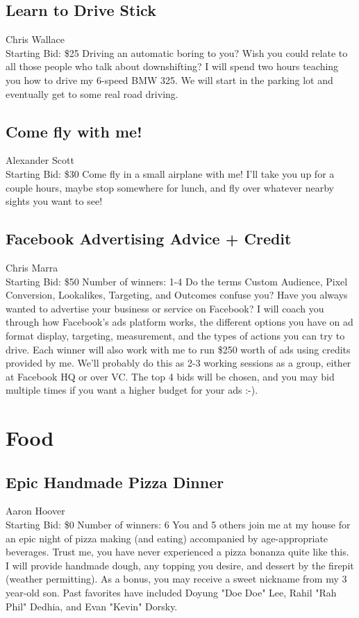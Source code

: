 \documentclass[11pt]{article}
\begin{document}
\subsection{Learn to Drive Stick}
Chris Wallace
\\
Starting Bid: \$25
\newline
Driving an automatic boring to you? Wish you could relate to all those people who talk about downshifting? I will spend two hours teaching you how to drive my 6-speed BMW 325. We will start in the parking lot and eventually get to some real road driving.
\subsection{Come fly with me!}
Alexander Scott
\\
Starting Bid: \$30
\newline
Come fly in a small airplane with me! I'll take you up for a couple hours, maybe stop somewhere for lunch, and fly over whatever nearby sights you want to see!
\subsection{Facebook Advertising Advice + Credit}
Chris Marra
\\
Starting Bid: \$50
\newline
Number of winners: 1-4
\newline
Do the terms Custom Audience, Pixel Conversion, Lookalikes, Targeting, and Outcomes confuse you? Have you always wanted to advertise your business or service on Facebook? I will coach you through how Facebook's ads platform works, the different options you have on ad format display, targeting, measurement, and the types of actions you can try to drive. Each winner will also work with me to run \$250 worth of ads using credits provided by me. We'll probably do this as 2-3 working sessions as a group, either at Facebook HQ or over VC. The top 4 bids will be chosen, and you may bid multiple times if you want a higher budget for your ads :-).
\section{Food}
\subsection{Epic Handmade Pizza Dinner}
Aaron Hoover
\\
Starting Bid: \$0
\newline
Number of winners: 6
\newline
You and 5 others join me at my house for an epic night of pizza making (and eating) accompanied by age-appropriate beverages. Trust me, you have never experienced a pizza bonanza quite like this. I will provide handmade dough, any topping you desire, and dessert by the firepit (weather permitting).  As a bonus, you may receive a sweet nickname from my 3 year-old son. Past favorites have included Doyung "Doe Doe" Lee, Rahil "Rah Phil" Dedhia, and Evan "Kevin" Dorsky.
\end{document}
